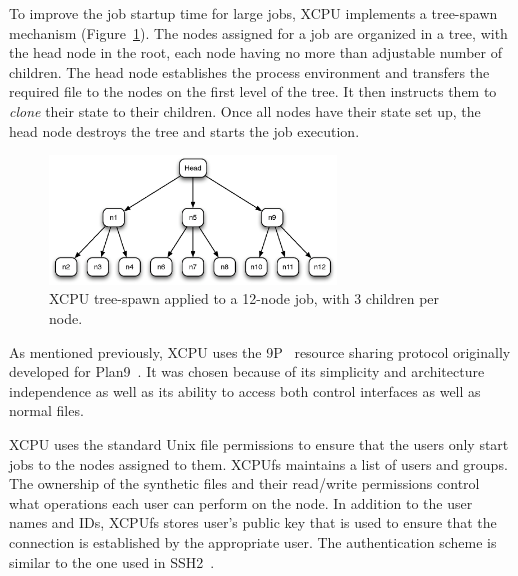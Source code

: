 \documentclass[10pt,conference,letterpaper]{IEEEtran}
\begin{document}
To improve the job startup time for large jobs, XCPU implements a
tree-spawn mechanism (Figure~\ref{fig:XCPU-tspawn}). The nodes assigned for
a job are organized in a tree, with the head node in the root, each node
having no more than adjustable number of children. The head node establishes
the process environment and transfers the required file to the nodes on the
first level of the tree. It then instructs them to \textsl{clone} their
state to their children. Once all nodes have their state set up, the head
node destroys the tree and starts the job execution.

\begin{figure}[h]
\begin{center}
\includegraphics[width=3in, keepaspectratio]{xcpu-tspawn.eps}
\end{center}
\caption{XCPU tree-spawn applied to a 12-node job, with 3 children per node.}
\label{fig:XCPU-tspawn}
\end{figure}

As mentioned previously, XCPU uses the 9P~\cite{9p} resource sharing protocol
originally developed for Plan9~\cite{pike95plan}.  It was chosen because 
of its simplicity and architecture independence as well as its ability to
access both control interfaces as well as normal files.

XCPU uses the standard Unix file permissions to ensure that the users only
start jobs to the nodes assigned to them. XCPUfs maintains a list of users
and groups. The ownership of the synthetic files and their read/write
permissions control what operations each user can perform on the node. In
addition to the user names and IDs, XCPUfs stores user's public key that is
used to ensure that the connection is established by the appropriate user.
The authentication scheme is similar to the one used in SSH2~\cite{rfc4252}.
\end{document}
